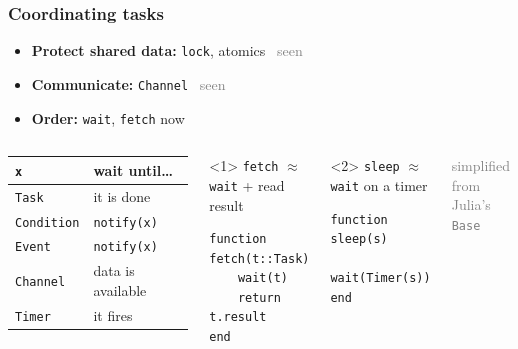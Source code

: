 \documentclass{beamer}
\newcommand{\cmark}{\ding{51}}%
\begin{document}
\begin{frame}[fragile, label=yield-points]
	\frametitle{Coordinating tasks}
	\begin{itemize}
		\item \textbf{Protect shared data:} \texttt{lock}, atomics \hfill\textcolor{gray}{\cmark\ seen}
		\item \textbf{Communicate:} \texttt{Channel} \hfill\textcolor{gray}{\cmark\ seen}
		\item \textbf{Order:} \texttt{wait}, \texttt{fetch} \hfill\alert{now}
	\end{itemize}

	\vfill
	\vspace{-0.6em}

	\vfill
	\begin{columns}[c]
		\centering\small
		\renewcommand{\arraystretch}{1.2}
		\begin{tabular}{l l}
			\textbf{\texttt{x}} & \textbf{wait until\ldots} \\
			\hline
			\texttt{Task}       & it is done                \\
			\texttt{Condition}  & \texttt{notify(x)}        \\
			\texttt{Event}      & \texttt{notify(x)}        \\
			\texttt{Channel}    & data is available         \\
			\texttt{Timer}      & it fires                  \\
		\end{tabular}

		\begin{onlyenv}<1>
			\texttt{fetch} \(\approx\) \texttt{wait} + read result
			\begin{verbatim}
function fetch(t::Task)
    wait(t)
    return t.result
end
			\end{verbatim}
		\end{onlyenv}
		\begin{onlyenv}<2>
			\texttt{sleep} \(\approx\) \texttt{wait} on a timer
			\begin{verbatim}
function sleep(s)
    wait(Timer(s))
end
			\end{verbatim}
		\end{onlyenv}
		\textcolor{gray}{\scriptsize simplified from Julia's \texttt{Base}}

		\medskip
	\end{columns}
\end{frame}
\end{document}
